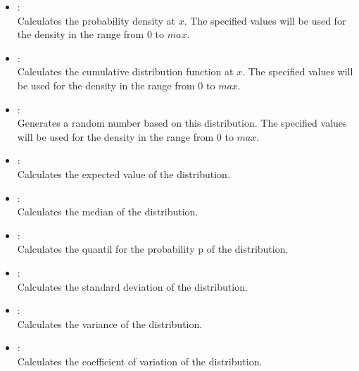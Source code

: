 \begin{itemize}

\item
{}:\\
Calculates the probability density at $x$.
The specified values will be used for the density in the range from 0 to $max$.

\item
{}:\\
Calculates the cumulative distribution function at $x$.
The specified values will be used for the density in the range from 0 to $max$.

\item
{}:\\
Generates a random number based on this distribution.
The specified values will be used for the density in the range from 0 to $max$.

\item
{}:\\
Calculates the expected value of the distribution.

\item
{}:\\
Calculates the median of the distribution.

\item
{}:\\
Calculates the quantil for the probability p of the distribution.

\item
{}:\\
Calculates the standard deviation of the distribution.

\item
{}:\\
Calculates the variance of the distribution.

\item
{}:\\
Calculates the coefficient of variation of the distribution.

\end{itemize}



